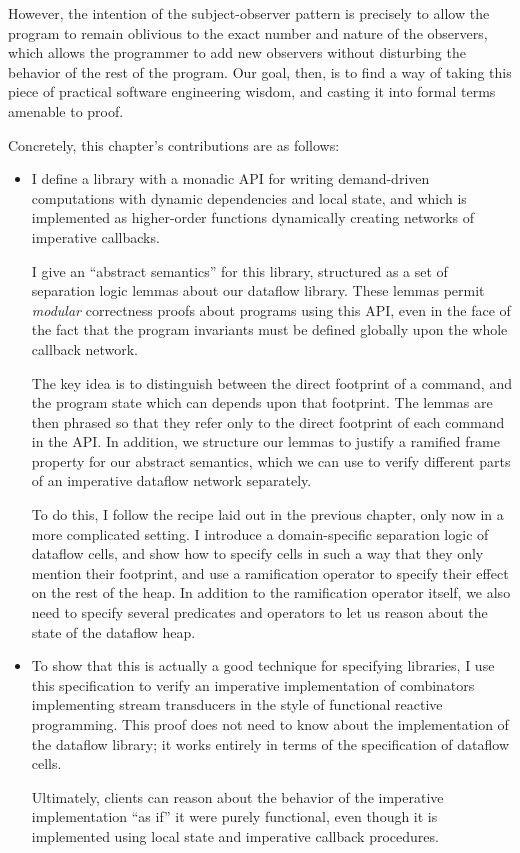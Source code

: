 However, the intention of the subject-observer pattern is precisely to
allow the program to remain oblivious to the exact number and nature
of the observers, which allows the programmer to add new observers
without disturbing the behavior of the rest of the program.  Our goal,
then, is to find a way of taking this piece of practical software
engineering wisdom, and casting it into formal terms amenable to
proof.

Concretely, this chapter's contributions are as follows: 

\begin{itemize}
  \item I define a library with a monadic API for writing
    demand-driven computations with dynamic dependencies and local
    state, and which is implemented as higher-order functions
    dynamically creating networks of imperative callbacks.

    I give an ``abstract semantics'' for this library, structured as a
    set of separation logic lemmas about our dataflow library. These
    lemmas permit \emph{modular} correctness proofs about programs
    using this API, even in the face of the fact that the program
    invariants must be defined globally upon the whole callback
    network.

    The key idea is to distinguish between the direct footprint of a
    command, and the program state which can depends upon that
    footprint. The lemmas are then phrased so that they refer only to
    the direct footprint of each command in the API. In addition, we
    structure our lemmas to justify a ramified frame property for our
    abstract semantics, which we can use to verify different parts of
    an imperative dataflow network separately.

    To do this, I follow the recipe laid out in the previous chapter,
    only now in a more complicated setting. I introduce a
    domain-specific separation logic of dataflow cells, and show how
    to specify cells in such a way that they only mention their
    footprint, and use a ramification operator to specify their effect
    on the rest of the heap. In addition to the ramification operator
    itself, we also need to specify several predicates and operators
    to let us reason about the state of the dataflow heap.

  \item To show that this is actually a good technique for specifying
    libraries, I use this specification to verify an imperative
    implementation of combinators implementing stream transducers in
    the style of functional reactive programming. This proof does not
    need to know about the implementation of the dataflow library; it
    works entirely in terms of the specification of dataflow cells.

    Ultimately, clients can reason about the behavior of the
    imperative implementation ``as if'' it were purely functional,
    even though it is implemented using local state and imperative
    callback procedures.
\end{itemize}

